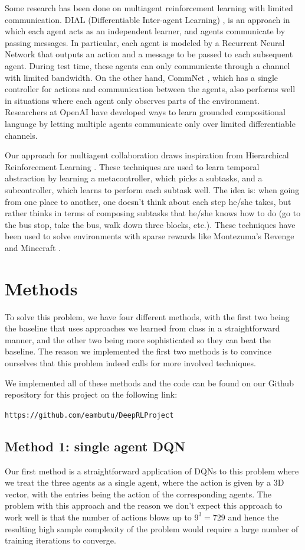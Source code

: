 \documentclass{article}
\begin{document}
Some research has been done on multiagent reinforcement learning
with limited communication. DIAL (Differentiable Inter-agent Learning) \cite{foerster2016learning},
is an approach in which
each agent acts as an independent learner, and agents communicate
by passing messages. In particular, each agent is modeled by
a Recurrent Neural Network that outputs an action and a message
to be passed to each subsequent agent. During test time, these
agents can only communicate through a channel with limited bandwidth.
On the other hand, CommNet \cite{sukhbaatar2016learning}, which
has a single controller for actions and communication
between the agents, also performs well in situations where each agent only
observes parts of the environment. Researchers at OpenAI
have developed ways to learn grounded compositional language
\cite{mordatch2017emergence} by letting multiple agents
communicate only over limited differentiable channels.


Our approach for multiagent collaboration draws inspiration from
Hierarchical Reinforcement Learning \cite{kulkarni2016hierarchical}. These techniques are used to learn
temporal abstraction by learning a metacontroller, which picks
a subtasks, and a subcontroller, which learns to perform each
subtask well. The idea is: when going from one place to another,
one doesn't think about each step he/she takes, but rather
thinks in terms of composing subtasks that he/she knows how to do (go to
the bus stop, take the bus, walk down three blocks, etc.).
These techniques have been used to solve environments with
sparse rewards like Montezuma's Revenge and Minecraft
\cite{tessler2016deep}.

\section{Methods}

To solve this problem, we have four different methods, with the
first two being the baseline that uses approaches we learned
from class in a straightforward manner, and the other two being
more sophisticated so they can beat the baseline. The
reason we implemented the first two methods is to
convince ourselves that
this problem indeed calls for more involved techniques.

We implemented all of these methods and the code can be found
on our Github repository for this project on the following link:

\texttt{https://github.com/eambutu/DeepRLProject}

\subsection{Method 1: single agent DQN}
Our first method is a straightforward application of
DQNs to this problem where we treat the three agents as a single agent,
where the action is given by a 3D vector, with the
entries being the action of the corresponding agents.
The problem with this approach and the reason we don't expect
this approach to work well is that the number of actions blows
up to $9^3=729$ and hence the resulting high sample complexity
of the problem would require a large number of training
iterations to converge.
\end{document}
